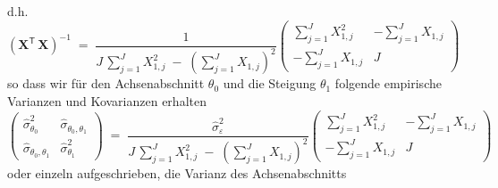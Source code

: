 d.h.
\begin{equation}
\left( \mathbf{X}^\mathsf{T}  \, \mathbf{X} \right)^{-1} \; = \;
\frac{1}{J \, \sum\limits_{j=1}^J X_{1,j}^2 \; - \;
	\left(\sum\limits_{j=1}^J X_{1,j}\right)^2}
\left(
\begin{array}{ccc}
\sum\limits_{j=1}^J X_{1,j}^2 & -\sum\limits_{j=1}^J X_{1,j} \\
-\sum\limits_{j=1}^J X_{1,j} & J
\end{array}
\right)
\end{equation}
so dass wir für den Achsenabschnitt $\theta_0$ und die Steigung $\theta_1$ folgende
empirische Varianzen und Kovarianzen erhalten
\begin{equation}
\left(\begin{array}{cc}
\hat \sigma^2_{\theta_0} &\hat \sigma_{\theta_0, \theta_1}\\
\hat \sigma_{\theta_0, \theta_1} & \hat \sigma^2_{\theta_1}
\end{array}\right)
\; = \;
\frac{\hat \sigma^2_\varepsilon}{J \, \sum\limits_{j=1}^J X_{1,j}^2 \; - \;
	\left(\sum\limits_{j=1}^J X_{1,j}\right)^2}
\left(
\begin{array}{ccc}
\sum\limits_{j=1}^J X_{1,j}^2 & -\sum\limits_{j=1}^J X_{1,j} \\
-\sum\limits_{j=1}^J X_{1,j} & J
\end{array}
\right)
\end{equation}
oder einzeln aufgeschrieben, die Varianz des Achsenabschnitts

